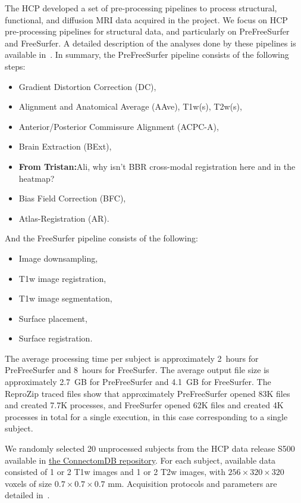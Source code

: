 \documentclass[a4paper,num-refs]{oup-contemporary}
\newcommand{\reprozip}[0]{ReproZip\xspace}
\newcommand{\tristan}[1]{\color{blue}\textbf{From Tristan:}#1\color{black}}
\begin{document}
The HCP developed a set of pre-processing pipelines to process structural,
functional, and diffusion MRI data acquired in the project. We focus on HCP
pre-processing pipelines for structural data, and particularly
on PreFreeSurfer and FreeSurfer. 
A detailed description of the analyses done by these
pipelines is available in~\cite{glasser2013}. 
In summary, the PreFreeSurfer pipeline consists of the following steps: 
\begin{itemize}
\item Gradient Distortion Correction (DC), 
\item Alignment and Anatomical Average (AAve), T1w(s), T2w(s),  
\item Anterior/Posterior Commissure Alignment (ACPC-A), 
\item Brain Extraction (BExt), 
\item \tristan{Ali, why isn't BBR cross-modal registration here and in the heatmap?}
\item Bias Field Correction (BFC), 
\item Atlas-Registration (AR).
\end{itemize}
And the FreeSurfer pipeline consists of the following:
\begin{itemize}
\item Image downsampling, 
\item T1w image registration, 
\item T1w image segmentation,
\item Surface placement, 
\item Surface registration.
\end{itemize}
The average processing time per subject is approximately 2~hours for
PreFreeSurfer and 8~hours for FreeSurfer. The average output file size is
approximately 2.7~GB for PreFreeSurfer and 4.1~GB for FreeSurfer.
The \reprozip traced files show that approximately PreFreeSurfer opened  
83K files and created 7.7K processes, and FreeSurfer opened 62K files and 
created 4K processes in total for a single execution, in this case corresponding to a single subject.

We randomly selected 20 unprocessed subjects 
from the HCP data release S500 
available in \href{https://db.humanconnectome.org}{the ConnectomDB repository}. 
For each subject, available data consisted of 1 or 2 T1w images and 1 or 2 T2w images, with 
$256 \times 320 \times 320$ voxels of size $0.7 \times 0.7 \times 0.7$ mm.
Acquisition protocols and parameters are detailed in~\cite{van2013wu}. 
\end{document}
